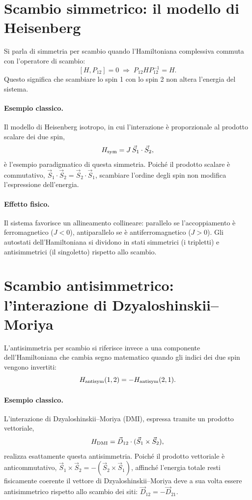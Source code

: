 \documentclass[11pt,a4paper]{article}
\begin{document}
\section{Scambio simmetrico: il modello di Heisenberg}

Si parla di simmetria per scambio quando l'Hamiltoniana complessiva commuta con
l'operatore di scambio:
$$[H,P_{12}]=0 \;\Longrightarrow\; P_{12}HP_{12}^{-1}=H.$$
Questo significa che scambiare lo spin 1 con lo spin 2 non altera l'energia del
sistema.

\paragraph{Esempio classico.} Il modello di Heisenberg isotropo, in cui l'interazione
\`e proporzionale al prodotto scalare dei due spin,
$$H_{\rm sym}=J\,\vec S_1\cdot\vec S_2,$$
\`e l'esempio paradigmatico di questa simmetria. Poich\'e il prodotto scalare \`e
commutativo, $\vec S_1\cdot\vec S_2=\vec S_2\cdot\vec S_1$, scambiare l'ordine degli
spin non modifica l'espressione dell'energia.

\paragraph{Effetto fisico.} Il sistema favorisce un allineamento collineare: parallelo
se l'accoppiamento \`e ferromagnetico ($J<0$), antiparallelo se \`e antiferromagnetico
($J>0$). Gli autostati dell'Hamiltoniana si dividono in stati simmetrici (i tripletti)
e antisimmetrici (il singoletto) rispetto allo scambio.

\section{Scambio antisimmetrico: l'interazione di Dzyaloshinskii--Moriya}

L'antisimmetria per scambio si riferisce invece a una componente dell'Hamiltoniana che
cambia segno matematico quando gli indici dei due spin vengono invertiti:
$$H_{\rm antisym}(1,2)=-H_{\rm antisym}(2,1).$$

\paragraph{Esempio classico.} L'interazione di Dzyaloshinskii--Moriya (DMI), espressa
tramite un prodotto vettoriale,
$$H_{\rm DMI}=\vec D_{12}\cdot(\vec S_1\times\vec S_2),$$
realizza esattamente questa antisimmetria. Poich\'e il prodotto vettoriale \`e
anticommutativo, $\vec S_1\times\vec S_2=-(\vec S_2\times\vec S_1)$, affinch\'e
l'energia totale resti fisicamente coerente il vettore di Dzyaloshinskii--Moriya deve a
sua volta essere antisimmetrico rispetto allo scambio dei siti: $\vec D_{12}=-\vec
D_{21}$.
\end{document}
